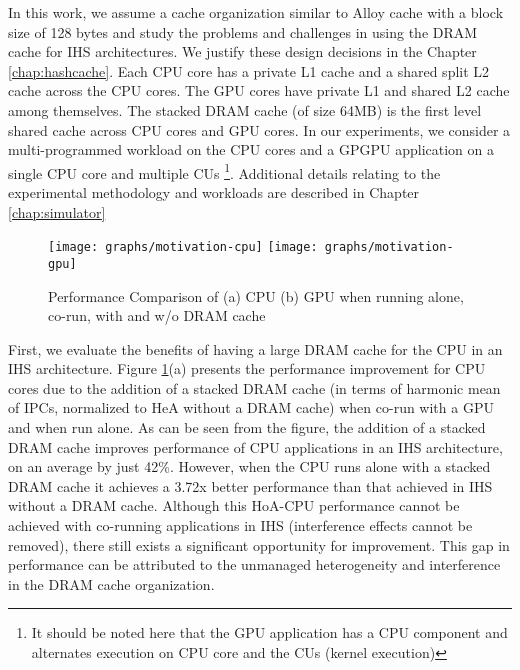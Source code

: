 \par In this work, we assume a cache organization similar to Alloy cache \cite{alloy} with a block size of 128 bytes and study the problems and challenges in using the DRAM cache for IHS architectures. We justify these design decisions in the Chapter \ref{chap:hashcache}. 
Each CPU core has a private L1 cache and a shared split L2 cache across the CPU cores. The GPU cores have private L1 and shared L2 cache among themselves.  
The stacked DRAM cache (of size 64MB) is the first level shared cache across CPU cores and GPU cores. In our experiments, we consider a multi-programmed workload on the CPU cores and a GPGPU application on a single CPU core and multiple CUs 
\footnote{It should be noted here that the GPU application has a CPU component and alternates execution on CPU core and the CUs (kernel execution)}. 
Additional details relating to the experimental methodology and workloads are described in Chapter \ref{chap:simulator}


\begin{figure}[htbp]
	\centering
	\texttt{[image: graphs/motivation-cpu]}
	\texttt{[image: graphs/motivation-gpu]}
	\caption{Performance Comparison of (a) CPU (b) GPU when running alone, co-run, with and w/o DRAM cache}
	\label{fig:motivation}
\end{figure}


\par First, we evaluate the benefits of having a large DRAM cache for the CPU in an IHS architecture. Figure \ref{fig:motivation}(a) presents the performance improvement for CPU cores due to the addition of a stacked DRAM cache (in terms of harmonic mean of IPCs, normalized to HeA without a DRAM cache) when co-run with a GPU and when run alone.
As can be seen from the figure, the addition of a stacked DRAM cache improves performance of CPU applications in an IHS architecture, on an average by just 42\%. However, when the CPU runs alone with a stacked DRAM cache it achieves a 3.72x better performance than that achieved in IHS without a DRAM cache. 
Although this HoA-CPU performance cannot be achieved with co-running applications in IHS (interference effects cannot be removed), there still exists a significant opportunity for improvement.
This gap in performance can be attributed to the unmanaged heterogeneity and interference in the DRAM cache organization.

